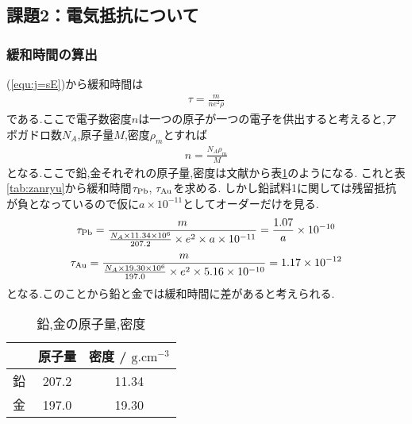 \subsection{課題2：電気抵抗について}
\subsubsection{緩和時間の算出}
(\ref{equ:j=sE})から緩和時間は
\begin{align}
  \tau=\frac{m}{ne^2\rho}
\end{align}
である.ここで電子数密度$n$は一つの原子が一つの電子を供出すると考えると,アボガドロ数$N_A$,原子量$M$,密度$\rho_m$とすれば
\begin{align}
  n=\frac{N_A\rho_m}{M}
\end{align}
となる.ここで鉛,金それぞれの原子量,密度は文献から表\ref{tab:mitudo}のようになる.
これと表\ref{tab:zanryu}から緩和時間$\tau_{\rm Pb}$, $\tau_{\rm Au}$を求める.
しかし鉛試料1に関しては残留抵抗が負となっているので仮に$a\times10^{-11}$としてオーダーだけを見る.
\begin{align}
  \tau_{\rm Pb}=\frac{m}{\frac{N_A\times11.34\times10^6}{207.2}\times e^2\times a\times10^{-11}}=\frac{1.07}{a}\times10^{-10}
\end{align}
\begin{align}
  \tau_{\rm Au}=\frac{m}{\frac{N_A\times19.30\times10^6}{197.0}\times e^2\times5.16\times10^{-10}}=1.17\times10^{-12}
\end{align}
となる.このことから鉛と金では緩和時間に差があると考えられる.
\begin{table}[h]
\caption{鉛,金の原子量,密度}
\label{tab:mitudo}
\centering
\begin{tabular}{c|cc}
\hline
&原子量&密度 / $\si{\gram.\centi\metre^{-3}}$\\
\hline \hline
鉛&207.2&11.34\\
金&197.0&19.30\\
\hline
\end{tabular}
\end{table}
